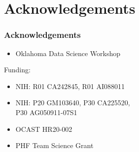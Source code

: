 \documentclass{beamer}
\begin{document}
\section{Acknowledgements}
\begin{frame}
\frametitle{Acknowledgements}
\Large{
\begin{itemize}[font=$\bullet$\scshape\bfseries]
    \item Oklahoma Data Science Workshop
\end{itemize}
\vspace{2mm}
Funding:
\begin{itemize}[font=$\bullet$\scshape\bfseries]
    \item NIH: R01 CA242845, R01 AI088011
    \item NIH: P20 GM103640, P30 CA225520, \\P30 AG050911-07S1 
    \item OCAST HR20-002
    \item PHF Team Science Grant
\end{itemize}
}
\end{frame}
\end{document}
